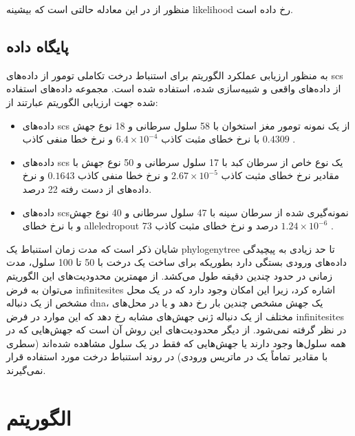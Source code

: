 منظور از  در این معادله حالتی است که بیشینه \gls{likelihood} رخ داده است.  

\subsection{پایگاه داده}

به منظور ارزیابی عملکرد الگوریتم  برای استنباط درخت تکاملی تومور از داده‌های \gls{scs} از داده‌های واقعی و شبیه‌سازی شده، استفاده شده است. مجموعه داده‌های استفاده شده جهت ارزیابی الگوریتم عبارتند از: 

\begin{itemize}
	\item      داده‌های  \gls{scs} از یک نمونه تومور مغز استخوان با 58 سلول سرطانی و 18 نوع جهش با نرخ خطای مثبت کاذب $6.4\times10^{-4}$ و نرخ خطا    منفی کاذب $ 0.4309$ . 
	\item     داده‌های  \gls{scs} یک نوع خاص از سرطان کبد با 17 سلول سرطانی و 50 نوع جهش با مقادیر نرخ خطای مثبت کاذب  $2.67 \times 10^{-5}$ و نرخ خطا منفی کاذب $0.1643$ و نرخ داده‌های از دست رفته 22 درصد. 
	\item     داده‌های \gls{scs}نمونه‌گیری شده از سرطان سینه با 47 سلول سرطانی و 40 نوع جهش و با نرخ خطای \gls{alleledropout} 73 درصد و نرخ خطای مثبت کاذب $1.24 \times 10^{-6}$ . 
\end{itemize}


شایان ذکر است که مدت زمان استنباط یک \gls{phylogenytree} تا حد زیادی به پیچیدگی داده‌های ورودی بستگی دارد بطوریکه برای ساخت یک درخت با 50 تا 100 سلول، مدت زمانی در حدود چندین دقیقه طول می‌کشد. از مهمترین محدودیت‌های این الگوریتم می‌توان به فرض \gls{infinitesites} اشاره کرد، زیرا این امکان وجود دارد که در یک محل مشخص از یک دنباله \gls{dna}، یک جهش مشخص چندین بار رخ دهد و یا در محل‌های مختلف از یک دنباله ژنی جهش‌های مشابه رخ دهد که این موارد در فرض \gls{infinitesites} در نظر گرفته نمی‌شود. از دیگر محدودیت‌های این روش آن است که جهش‌هایی که در همه سلول‌ها وجود دارند یا جهش‌هایی که فقط در یک سلول مشاهده شده‌اند (سطری با مقادیر تماماً یک در ماتریس ورودی) در روند استنباط درخت مورد استفاده قرار نمی‌گیرند. 


\section{الگوریتم  \cite{ross2016onconem}}


